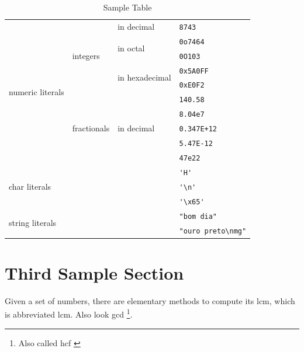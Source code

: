 \documentclass[twoside]{report}
\numberwithin{equation}{section}		%
\numberwithin{figure}{section}			%
\numberwithin{table}{section}
\begin{document}
    \begin{table}
        \begin{center}
            \begin{tabular}{|l|l|l|l|}\hline
                \multirow{10}{*}{numeric literals} & \multirow{5}{*}{integers} & in decimal & \verb|8743| \\ \cline{3-4}
                & & \multirow{2}{*}{in octal} & \verb|0o7464| \\ \cline{4-4}
                & & & \verb|0O103| \\ \cline{3-4}
                & & \multirow{2}{*}{in hexadecimal} & \verb|0x5A0FF| \\ \cline{4-4}
                & & & \verb|0xE0F2| \\ \cline{2-4}
                & \multirow{5}{*}{fractionals} & \multirow{5}{*}{in decimal} & \verb|140.58| \\ \cline{4-4}
                & & & \verb|8.04e7| \\ \cline{4-4}
                & & & \verb|0.347E+12| \\ \cline{4-4}
                & & & \verb|5.47E-12| \\ \cline{4-4}
                & & & \verb|47e22| \\ \cline{1-4}
                \multicolumn{3}{|l|}{\multirow{3}{*}{char literals}} & \verb|'H'| \\ \cline{4-4}
                \multicolumn{3}{|l|}{} & \verb|'\n'| \\ \cline{4-4}          %
                \multicolumn{3}{|l|}{} & \verb|'\x65'| \\ \cline{1-4}        %
                \multicolumn{3}{|l|}{\multirow{2}{*}{string literals}} & \verb|"bom dia"| \\ \cline{4-4}
                \multicolumn{3}{|l|}{} & \verb|"ouro preto\nmg"| \\ \cline{1-4}          %
            \end{tabular}
            \caption{Sample Table}
        \end{center}
    \end{table}
    
    \section{Third Sample Section}
    Given a set of numbers, there are elementary methods to compute 
    its \acrlong{lcm}, which is abbreviated \gls{lcm}. Also look 
    \acrfull{gcd} \footnote{Also called \acrfull{hcf} \cite{einstein}}.
    \lipsum[4-5]

    \clearpage
    
    
\end{document}
